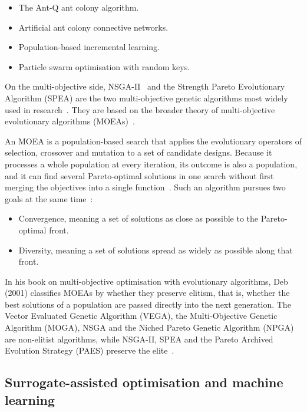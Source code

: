\begin{itemize}
  \item The Ant-Q ant colony algorithm.

  \item Artificial ant colony connective networks.

  \item Population-based incremental learning.

  \item Particle swarm optimisation with random keys.
\end{itemize}

On the multi-objective side, NSGA-II~\cite{deb_nsga2_2002} and the Strength Pareto Evolutionary Algorithm (SPEA) are
the two multi-objective genetic algorithms most widely used in
research~\cite{stewart_2021}. They are based on the broader theory of
multi-objective evolutionary algorithms
(MOEAs)~\cite{deb_2001,coello_2007}.

An MOEA is a population-based search that applies the evolutionary
operators of selection, crossover and mutation to a set of candidate
designs. Because it processes a whole population at every iteration, its
outcome is also a population, and it can find several Pareto-optimal
solutions in one search without first merging the objectives into a single
function~\cite{deb_2001}. Such an algorithm pursues two goals at the same
time~\cite{deb_2001}:

\begin{itemize}
  \item Convergence, meaning a set of solutions as close as possible to
        the Pareto-optimal front.

  \item Diversity, meaning a set of solutions spread as widely as
        possible along that front.
\end{itemize}

In his book on multi-objective optimisation with evolutionary algorithms,
Deb (2001) classifies MOEAs by whether they preserve elitism, that is, whether
the best solutions of a population are passed directly into the next
generation. The Vector Evaluated Genetic Algorithm (VEGA), the Multi-Objective
Genetic Algorithm (MOGA), NSGA and the Niched Pareto Genetic Algorithm
(NPGA) are non-elitist algorithms, while NSGA-II, SPEA and the Pareto
Archived Evolution Strategy (PAES) preserve the elite~\cite{deb_2001}.

\subsection{Surrogate-assisted optimisation and machine learning}
\label{sec:lit-opt-surrogate}


